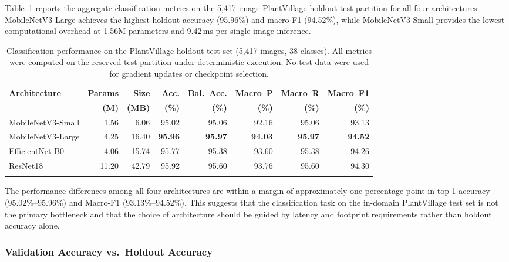 \documentclass[pdflatex,sn-mathphys-num]{sn-jnl}
\theoremstyle{thmstyleone}%
\theoremstyle{thmstyletwo}%
\theoremstyle{thmstylethree}%
\begin{document}
Table~\ref{tab:pv_results} reports the aggregate classification metrics on the
5{,}417-image PlantVillage holdout test partition for all four architectures.
MobileNetV3-Large achieves the highest holdout accuracy (95.96\%) and macro-F1
(94.52\%), while MobileNetV3-Small provides the lowest computational overhead at
1.56M parameters and 9.42\,ms per single-image inference.

\begin{table}[htbp]
\caption{Classification performance on the PlantVillage holdout test set (5{,}417 images, 38 classes). All metrics were computed on the reserved test partition under deterministic execution. No test data were used for gradient updates or checkpoint selection.}\label{tab:pv_results}%
\footnotesize
\setlength{\tabcolsep}{2pt}%
\begin{tabular*}{\textwidth}{@{\extracolsep\fill}lrrrrrrr}
\toprule
\textbf{Architecture} & \textbf{Params} & \textbf{Size} & \textbf{Acc.} & \textbf{Bal.~Acc.} & \textbf{Macro~P} & \textbf{Macro~R} & \textbf{Macro~F1} \\
& \textbf{(M)} & \textbf{(MB)} & \textbf{(\%)} & \textbf{(\%)} & \textbf{(\%)} & \textbf{(\%)} & \textbf{(\%)} \\
\midrule
MobileNetV3-Small  & 1.56 &  6.06 & 95.02 & 95.06 & 92.16 & 95.06 & 93.13 \\
MobileNetV3-Large  & 4.25 & 16.40 & \textbf{95.96} & \textbf{95.97} & \textbf{94.03} & \textbf{95.97} & \textbf{94.52} \\
EfficientNet-B0    & 4.06 & 15.74 & 95.77 & 95.38 & 93.60 & 95.38 & 94.26 \\
ResNet18           & 11.20 & 42.79 & 95.92 & 95.60 & 93.76 & 95.60 & 94.30 \\
\botrule
\end{tabular*}
\end{table}

The performance differences among all four architectures are within a margin of
approximately one percentage point in top-1 accuracy (95.02\%--95.96\%) and Macro-F1
(93.13\%--94.52\%). This suggests that the classification task on the in-domain
PlantVillage test set is not the primary bottleneck and that the choice of architecture
should be guided by latency and footprint requirements rather than holdout accuracy alone.

\subsubsection{Validation Accuracy vs.\ Holdout Accuracy}
\end{document}
